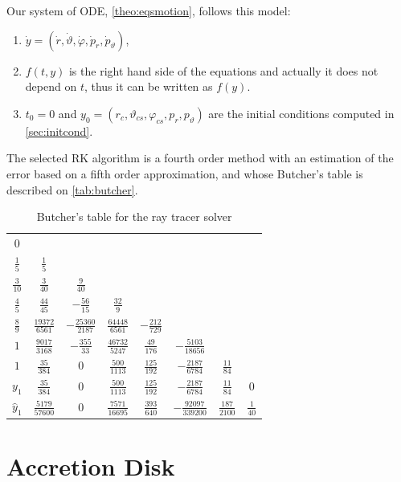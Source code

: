 Our system of \ac{ODE}, \autoref{theo:eqsmotion}, follows this model:
\begin{enumerate}
	\item $\dot{y} = (\dot{r}, \dot{\vartheta}, \dot{\varphi}, \dot{p}_r, \dot{p}_\vartheta)$,
	\item $f(t,y)$ is the right hand side of the equations and actually it does not depend on $t$, thus it can be written as $f(y)$.
	\item $t_0 = 0$ and $y_0 = (r_c, \vartheta_{cs}, \varphi_{cs}, p_{r}, p_{\vartheta})$ are the initial conditions computed in \autoref{sec:initcond}.
\end{enumerate}

The selected \ac{RK} algorithm is a fourth order method with an estimation of the error based on a fifth order approximation, and whose Butcher's table is described on \autoref{tab:butcher}.

\begin{table}[bth]
	\myfloatalign
	\begin{tabularx}{.9\textwidth}{c|ccccccc}
		$0$&  & & & & & & \\
		$\frac{1}{5}$&  $\frac{1}{5}$& & & & & & \\
		$\frac{3}{10}$&  $\frac{3}{40}$&  $\frac{9}{40}$& & & & & \\
		$\frac{4}{5}$&  $\frac{44}{45}$&  $-\frac{56}{15}$&  $\frac{32}{9}$& & & & \\
		$\frac{8}{9}$&  $\frac{19372}{6561}$&  $-\frac{25360}{2187}$&  $\frac{64448}{6561}$&  $-\frac{212}{729}$& & & \\
		$1$&  $\frac{9017}{3168}$&  $-\frac{355}{33}$&  $\frac{46732}{5247}$&  $\frac{49}{176}$&  $-\frac{5103}{18656}$& & \\
		$1$&  $\frac{35}{384}$&  $0$&  $\frac{500}{1113}$&  $\frac{125}{192}$&  $-\frac{2187}{6784}$&  $\frac{11}{84}$& \\ \hline
		$y_1$&  $\frac{35}{384}$&  $0$&  $\frac{500}{1113}$&  $\frac{125}{192}$&  $-\frac{2187}{6784}$&  $\frac{11}{84}$&  $0$ \\ \hline
		$\widehat{y}_1$&  $\frac{5179}{57600}$&  $0$&  $\frac{7571}{16695}$&  $\frac{393}{640}$&  $-\frac{92097}{339200}$&  $\frac{187}{2100}$&  $\frac{1}{40}$
	\end{tabularx}
	\caption{Butcher's table for the ray tracer solver}
	\label{tab:butcher}
\end{table}

\section{Accretion Disk}

